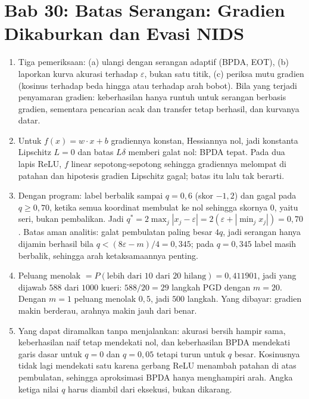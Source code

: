 \section*{Bab 30: Batas Serangan: Gradien Dikaburkan dan Evasi NIDS}
\begin{enumerate}[label=\textbf{30.\arabic*}]
  \item Tiga pemeriksaan: (a) ulangi dengan serangan adaptif (BPDA, EOT), (b)
        laporkan kurva akurasi terhadap $\varepsilon$, bukan satu titik, (c) periksa
        mutu gradien (kosinus terhadap beda hingga atau terhadap arah bobot). Bila
        yang terjadi penyamaran gradien: keberhasilan hanya runtuh untuk serangan
        berbasis gradien, sementara pencarian acak dan transfer tetap berhasil, dan
        kurvanya datar.

  \item Untuk $f(x)=w\cdot x+b$ gradiennya konstan, Hessiannya nol, jadi konstanta
        Lipschitz $L=0$ dan batas $L\delta$ memberi galat nol: BPDA tepat. Pada dua
        lapis ReLU, $f$ linear sepotong-sepotong sehingga gradiennya melompat di
        patahan dan hipotesis gradien Lipschitz gagal; batas itu lalu tak berarti.

  \item 
Dengan program: label berbalik sampai $q=0{,}6$ (skor $-1{,}2$) dan gagal
        pada $q\ge0{,}70$, ketika semua koordinat membulat ke nol sehingga skornya
        $0$, yaitu seri, bukan pembalikan. Jadi
        $q^{*}=2\max_{j}|x_{j}-\varepsilon|=2(\varepsilon+|\min_{j}x_{j}|)=0{,}70$.
        Batas aman analitis: galat pembulatan paling besar $4q$, jadi serangan hanya
        dijamin berhasil bila $q<(8\varepsilon-m)/4=0{,}345$; pada $q=0{,}345$ label
        masih berbalik, sehingga arah ketaksamaannya penting.

  \item Peluang menolak $=P(\text{lebih dari }10\text{ dari }20\text{ hilang})
        =0{,}411901$, jadi yang dijawab $588$ dari $1000$ kueri: $588/20=29$
        langkah PGD dengan $m=20$. Dengan $m=1$ peluang menolak $0{,}5$, jadi $500$
        langkah. Yang dibayar: gradien makin berderau, arahnya makin jauh dari benar.

  \item Yang dapat diramalkan tanpa menjalankan: akurasi bersih hampir sama,
        keberhasilan naif tetap mendekati nol, dan keberhasilan BPDA mendekati garis
        dasar untuk $q=0$ dan $q=0{,}05$ tetapi turun untuk $q$ besar. Kosinusnya
        tidak lagi mendekati satu karena gerbang ReLU menambah patahan di atas
        pembulatan, sehingga aproksimasi BPDA hanya menghampiri arah. Angka ketiga
        nilai $q$ harus diambil dari eksekusi, bukan dikarang.


\end{enumerate}
